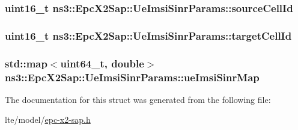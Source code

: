 \subsubsection[{\texorpdfstring{source\+Cell\+Id}{sourceCellId}}]{\setlength{\rightskip}{0pt plus 5cm}uint16\+\_\+t ns3\+::\+Epc\+X2\+Sap\+::\+Ue\+Imsi\+Sinr\+Params\+::source\+Cell\+Id}\hypertarget{structns3_1_1EpcX2Sap_1_1UeImsiSinrParams_a5d24974fd386fe67a19f3880d41911d8}{}\label{structns3_1_1EpcX2Sap_1_1UeImsiSinrParams_a5d24974fd386fe67a19f3880d41911d8}
\subsubsection[{\texorpdfstring{target\+Cell\+Id}{targetCellId}}]{\setlength{\rightskip}{0pt plus 5cm}uint16\+\_\+t ns3\+::\+Epc\+X2\+Sap\+::\+Ue\+Imsi\+Sinr\+Params\+::target\+Cell\+Id}\hypertarget{structns3_1_1EpcX2Sap_1_1UeImsiSinrParams_a29c9f622ca47fd3dced9e599a279403e}{}\label{structns3_1_1EpcX2Sap_1_1UeImsiSinrParams_a29c9f622ca47fd3dced9e599a279403e}
\subsubsection[{\texorpdfstring{ue\+Imsi\+Sinr\+Map}{ueImsiSinrMap}}]{\setlength{\rightskip}{0pt plus 5cm}std\+::map$<$uint64\+\_\+t, double$>$ ns3\+::\+Epc\+X2\+Sap\+::\+Ue\+Imsi\+Sinr\+Params\+::ue\+Imsi\+Sinr\+Map}\hypertarget{structns3_1_1EpcX2Sap_1_1UeImsiSinrParams_a9d0b6d3df52a5db038673a7ef2e01d29}{}\label{structns3_1_1EpcX2Sap_1_1UeImsiSinrParams_a9d0b6d3df52a5db038673a7ef2e01d29}


The documentation for this struct was generated from the following file\+:\begin{DoxyCompactItemize}
\item 
lte/model/\hyperlink{epc-x2-sap_8h}{epc-\/x2-\/sap.\+h}\end{DoxyCompactItemize}

